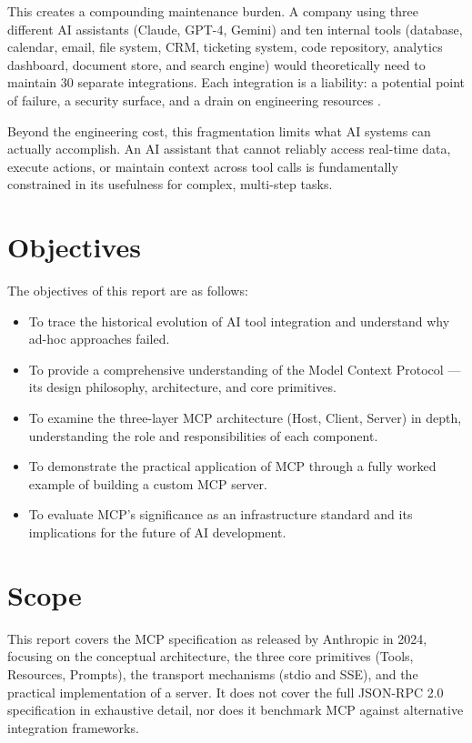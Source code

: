 This creates a compounding maintenance burden. A company using three different AI assistants (Claude, GPT-4, Gemini) and ten internal tools (database, calendar, email, file system, CRM, ticketing system, code repository, analytics dashboard, document store, and search engine) would theoretically need to maintain 30 separate integrations. Each integration is a liability: a potential point of failure, a security surface, and a drain on engineering resources \cite{anthropic2024mcp}.

Beyond the engineering cost, this fragmentation limits what AI systems can actually accomplish. An AI assistant that cannot reliably access real-time data, execute actions, or maintain context across tool calls is fundamentally constrained in its usefulness for complex, multi-step tasks.

\section{Objectives}
The objectives of this report are as follows:
\begin{itemize}
    \item To trace the historical evolution of AI tool integration and understand why ad-hoc approaches failed.
    \item To provide a comprehensive understanding of the Model Context Protocol — its design philosophy, architecture, and core primitives.
    \item To examine the three-layer MCP architecture (Host, Client, Server) in depth, understanding the role and responsibilities of each component.
    \item To demonstrate the practical application of MCP through a fully worked example of building a custom MCP server.
    \item To evaluate MCP's significance as an infrastructure standard and its implications for the future of AI development.
\end{itemize}

\section{Scope}
This report covers the MCP specification as released by Anthropic in 2024, focusing on the conceptual architecture, the three core primitives (Tools, Resources, Prompts), the transport mechanisms (stdio and SSE), and the practical implementation of a server. It does not cover the full JSON-RPC 2.0 specification in exhaustive detail, nor does it benchmark MCP against alternative integration frameworks.

